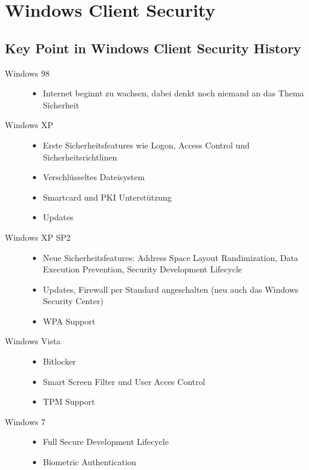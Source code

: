 \section{Windows Client Security}
\subsection{Key Point in Windows Client Security History}
\begin{description}
    \item[Windows 98] \hfill
    \begin{itemize}
        \item Internet beginnt zu wachsen, dabei denkt noch niemand an das Thema Sicherheit
    \end{itemize}
    \item[Windows XP] \hfill
    \begin{itemize}
        \item Erste Sicherheitsfeatures wie Logon, Access Control und Sicherheitsrichtlinen
        \item Verschlüsseltes Dateisystem
        \item Smartcard und PKI Unterstützung
        \item Updates
    \end{itemize}
    \item[Windows XP SP2] \hfill
    \begin{itemize}
        \item Neue Sicherheitsfeatures: Address Space Layout Randimization, Data Execution Prevention, Security Development Lifecycle
        \item Updates, Firewall per Standard angeschalten (neu auch das Windows Security Center)
        \item WPA Support
    \end{itemize}
    \item[Windows Vista]
    \begin{itemize}
        \item Bitlocker
        \item Smart Screen Filter und User Acces Control
        \item TPM Support
    \end{itemize}
    \item[Windows 7]
    \begin{itemize}
        \item Full Secure Development Lifecycle 
        \item Biometric Authentication

\end{itemize}
\end{description}
